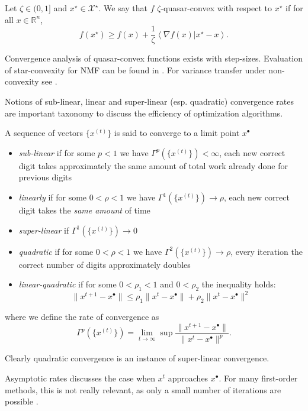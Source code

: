 \documentclass{article}
\newcommand{\innerp}[2]{\left\langle #1 \vert #2 \right\rangle}
\newcommand{\optimal}[1]{{#1^{\scriptscriptstyle\bullet}}}
\begin{document}
\begin{definition}[label=3m5jm_az, name=Quasar Convex]
	Let \( \zeta\in(0,1] \) and \( x^\star\in\mathcal X^\star\). We say that \( f \) \( \zeta \)-quasar-convex with respect to \( x^\star \) if for all \( x\in\mathbb R^n \),
	\[
		f(x^\star) \geq f(x) + \frac{1}{\zeta}\innerp{\nabla f(x)}{x^\star - x}.
	\]

	\begin{literature}[label=c9swuw97]
		Convergence analysis of quasar-convex functions exists with \cite[constant and decreasing][subsection.4.1]{structured_nonconvex_functions} step-sizes. Evaluation of star-convexity for NMF can be found in \cite{star_convexity_nmf}. For variance transfer under non-convexity see \cite[Example 2.2][example.2.2]{sgd_arbitrary_sampling}.
	\end{literature}
\end{definition}
\begin{definition}[label=v_o4l6wn, name=Asymptotic Convergence Rates]
	Notions of sub-linear, linear and super-linear (esp. quadratic) convergence rates are important taxonomy to discuss the efficiency of optimization algorithms.

	A sequence of vectors \( \{ x^{(t)} \} \) is said to converge to a limit point \( \optimal{x} \)
	\begin{itemize}
		\item \emph{sub-linear} if for some \( p < 1 \) we have \( \Gamma^p(\{x^{(t)} \}) < \infty \), each new correct digit takes approximately the same amount of total work already done for previous digits
		\item \emph{linearly} if for some \( 0 < \rho < 1 \) we have \(\Gamma^1(\{x^{(t)} \}) \to \rho\), each new correct digit takes the \emph{same amount} of time
		\item \emph{super-linear} if \( \Gamma^1(\{x^{(t)} \}) \to 0 \)
		\item \emph{quadratic} if for some \( 0 < \rho < 1 \) we have \( \Gamma^2(\{x^{(t)} \}) \to \rho \), every iteration the correct number of digits approximately doubles
		\item \emph{linear-quadratic} if for some \( 0 < \rho_1 < 1 \) and \( 0 < \rho_2 \) the inequality holds:
			\[
				\lVert x^{t+1} - \optimal{x}\rVert \leq \rho_1\lVert x^t - \optimal{x}\rVert + \rho_2\lVert x^t - \optimal{x}\rVert^2
			\]
	\end{itemize}
	where we define the rate of convergence as
	\[
		\Gamma^p(\{x^{(t)} \}) = \lim_{t\to\infty}\sup\frac{\lVert x^{t+1} - \optimal{x}\rVert}{\lVert x^t - \optimal{x}\rVert^p}.
	\]

	Clearly quadratic convergence is an instance of super-linear convergence.

	\begin{example}[label=ok2t_031, name=Sublinear Convergence in First-Order Methods]
		Asymptotic rates discusses the case when \( x^t \) approaches \( \optimal{x} \). For many first-order methods, this is not really relevant, as only a small number of iterations are possible \cite{sublinear_rate}.
	\end{example}

\end{definition}
\end{document}
